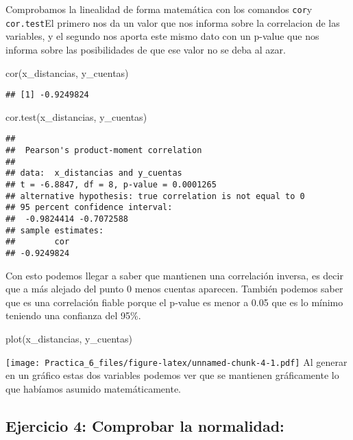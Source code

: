 \documentclass[
]{article}
\newenvironment{Shaded}{\begin{snugshade}}{\end{snugshade}}
\newcommand{\FunctionTok}[1]{\textcolor[rgb]{0.00,0.00,0.00}{#1}}
\newcommand{\NormalTok}[1]{#1}
\begin{document}
Comprobamos la linealidad de forma matemática con los comandos
\texttt{cor}y \texttt{cor.test}El primero nos da un valor que nos
informa sobre la correlacion de las variables, y el segundo nos aporta
este mismo dato con un p-value que nos informa sobre las posibilidades
de que ese valor no se deba al azar.

\begin{Shaded}
\begin{Highlighting}[]
\FunctionTok{cor}\NormalTok{(x\_distancias, y\_cuentas)}
\end{Highlighting}
\end{Shaded}

\begin{verbatim}
## [1] -0.9249824
\end{verbatim}

\begin{Shaded}
\begin{Highlighting}[]
\FunctionTok{cor.test}\NormalTok{(x\_distancias, y\_cuentas)}
\end{Highlighting}
\end{Shaded}

\begin{verbatim}
## 
##  Pearson's product-moment correlation
## 
## data:  x_distancias and y_cuentas
## t = -6.8847, df = 8, p-value = 0.0001265
## alternative hypothesis: true correlation is not equal to 0
## 95 percent confidence interval:
##  -0.9824414 -0.7072588
## sample estimates:
##        cor 
## -0.9249824
\end{verbatim}

Con esto podemos llegar a saber que mantienen una correlación inversa,
es decir que a más alejado del punto 0 menos cuentas aparecen. También
podemos saber que es una correlación fiable porque el p-value es menor a
0.05 que es lo mínimo teniendo una confianza del 95\%.

\begin{Shaded}
\begin{Highlighting}[]
\FunctionTok{plot}\NormalTok{(x\_distancias, y\_cuentas)}
\end{Highlighting}
\end{Shaded}

\texttt{[image: Practica\_6\_files/figure-latex/unnamed-chunk-4-1.pdf]} Al
generar en un gráfico estas dos variables podemos ver que se mantienen
gráficamente lo que habíamos asumido matemáticamente.

\hypertarget{ejercicio-4-comprobar-la-normalidad}{%
\subsection{Ejercicio 4: Comprobar la
normalidad:}\label{ejercicio-4-comprobar-la-normalidad}}
\end{document}
